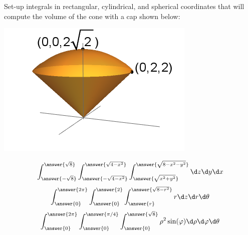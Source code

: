 \documentclass{ximera}
\author{Bart Snapp}
\begin{document}
\begin{exercise}
  Set-up integrals in rectangular, cylindrical, and spherical
  coordinates that will compute the volume of the cone with a cap shown below:
  \begin{image}
    \includegraphics{coneWithCap1.png}
  \end{image}
  \begin{prompt}
  \[
  \int_{\answer{-\sqrt{8}}}^{\answer{\sqrt{8}}}\int_{\answer{-\sqrt{4-x^2}}}^{\answer{\sqrt{4-x^2}}}\int_{\answer{\sqrt{x^2+y^2}}}^{\answer{\sqrt{8-x^2-y^2}}}\d z \d y \d x
  \]
  \[
  \int_{\answer{0}}^{\answer{2\pi}}\int_{\answer{0}}^{\answer{2}}\int_{\answer{r}}^{\answer{\sqrt{8-r^2}}}   r\d z \d r \d \theta
  \]
  \[
  \int_{\answer{0}}^{\answer{2\pi}}\int_{\answer{0}}^{\answer{\pi/4}}\int_{\answer{0}}^{\answer{\sqrt{8}}}   \rho^2\sin(\varphi)\d \rho \d \varphi \d \theta
  \]
  \end{prompt}
\end{exercise}
\end{document}
